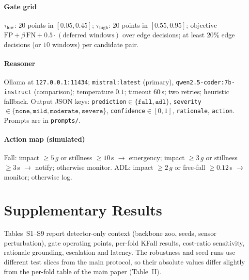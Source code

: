 \documentclass[journal]{IEEEtran}
\begin{document}
\paragraph{Gate grid} $\tau_{\mathrm{low}}$: $20$ points in $[0.05,0.45]$; $\tau_{\mathrm{high}}$: $20$ points in $[0.55,0.95]$; objective $\mathrm{FP}+\beta\,\mathrm{FN}+0.5\cdot(\text{deferred windows})$ over edge decisions; at least $20\%$ edge decisions (or $10$ windows) per candidate pair.
\paragraph{Reasoner} Ollama at \texttt{127.0.0.1:11434}; \texttt{mistral:latest} (primary), \texttt{qwen2.5-coder:7b-instruct} (comparison); temperature $0.1$; timeout $60$\,s; two retries; heuristic fallback. Output JSON keys: \texttt{prediction}$\in\{\texttt{fall},\texttt{adl}\}$, \texttt{severity}$\in\{\texttt{none},\texttt{mild},\texttt{moderate},\texttt{severe}\}$, \texttt{confidence}$\in[0,1]$, \texttt{rationale}, \texttt{action}. Prompts are in \texttt{prompts/}.
\paragraph{Action map (simulated)} Fall: impact $\ge 5\,g$ or stillness $\ge 10$\,s $\rightarrow$ emergency; impact $\ge 3\,g$ or stillness $\ge 3$\,s $\rightarrow$ notify; otherwise monitor. ADL: impact $\ge 2\,g$ or free-fall $\ge 0.12$\,s $\rightarrow$ monitor; otherwise log.

\section{Supplementary Results}
\label{sup:results}
Tables~S1--S9 report detector-only context (backbone zoo, seeds, sensor perturbation), gate operating points, per-fold KFall results, cost-ratio sensitivity, rationale grounding, escalation and latency. The robustness and seed runs use different test slices from the main protocol, so their absolute values differ slightly from the per-fold table of the main paper (Table~II).










\end{document}
